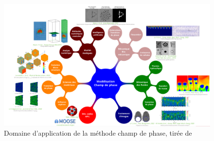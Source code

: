 \documentclass[a4paper,11pt,fleqn]{report}    %
\begin{document}
\begin{figure}[h!]
	\centering
	\includegraphics[width=0.9\linewidth]{figure/champ_phase}
	\caption[Domaine d'application de la méthode champ de phase]{Domaine d'application de la méthode champ de phase, tirée de \cite{introini_suivi_nodate}}
	\label{fig:champphase}
\end{figure} 
\end{document}
